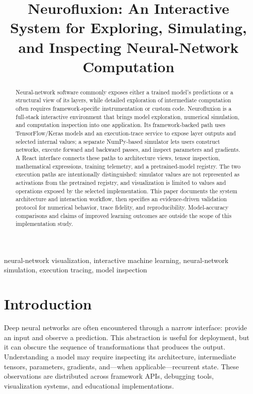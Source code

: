 \documentclass[conference]{IEEEtran}
\title{Neurofluxion: An Interactive System for Exploring, Simulating, and Inspecting Neural-Network Computation}
\author{\IEEEauthorblockN{Rayyan Ahmed Khan}
\IEEEauthorblockA{Department of Computer Science and Engineering\\
HKBK College of Engineering, Bengaluru, India\\
}}
\begin{document}
\maketitle

\begin{abstract}
Neural-network software commonly exposes either a trained model's predictions or a structural view of its layers, while detailed exploration of intermediate computation often requires framework-specific instrumentation or custom code. Neurofluxion is a full-stack interactive environment that brings model exploration, numerical simulation, and computation inspection into one application. Its framework-backed path uses TensorFlow/Keras models and an execution-trace service to expose layer outputs and selected internal values; a separate NumPy-based simulator lets users construct networks, execute forward and backward passes, and inspect parameters and gradients. A React interface connects these paths to architecture views, tensor inspection, mathematical expressions, training telemetry, and a pretrained-model registry. The two execution paths are intentionally distinguished: simulator values are not represented as activations from the pretrained registry, and visualization is limited to values and operations exposed by the selected implementation. This paper documents the system architecture and interaction workflow, then specifies an evidence-driven validation protocol for numerical behavior, trace fidelity, and reproducibility. Model-accuracy comparisons and claims of improved learning outcomes are outside the scope of this implementation study.
\end{abstract}

\begin{IEEEkeywords}
neural-network visualization, interactive machine learning, neural-network simulation, execution tracing, model inspection
\end{IEEEkeywords}

\section{Introduction}
Deep neural networks are often encountered through a narrow interface: provide an input and observe a prediction. This abstraction is useful for deployment, but it can obscure the sequence of transformations that produces the output. Understanding a model may require inspecting its architecture, intermediate tensors, parameters, gradients, and—when applicable—recurrent state. These observations are distributed across framework APIs, debugging tools, visualization systems, and educational implementations.
\end{document}
